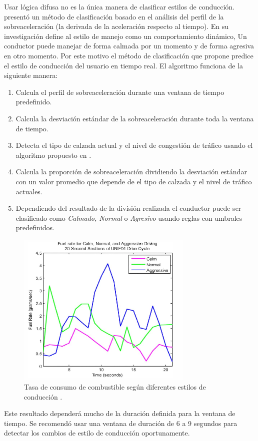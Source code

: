 Usar lógica difusa no es la única manera de clasificar estilos de conducción. \citeauthor{4938719} \cite{4938719} presentó un método de clasificación basado en el análisis del perfil de la sobreaceleración (la derivada de la aceleración respecto al tiempo). En su investigación define al estilo de manejo como un comportamiento dinámico, Un conductor puede manejar de forma calmada por un momento y de forma agresiva en otro momento. Por este motivo el método de clasificación que propone predice el estilo de conducción del usuario en tiempo real.
El algoritmo funciona de la siguiente manera:
\begin{enumerate}
    \itemsep0em
    \item Calcula el perfil de sobreaceleración durante una ventana de tiempo predefinido.
    \item Calcula la desviación estándar de la sobreaceleración durante toda la ventana de tiempo.
    \item Detecta el tipo de calzada actual y el nivel de congestión de tráfico usando el algoritmo propuesto en \cite{Highway_cap_manual}.
    \item Calcula la proporción de sobreaceleración dividiendo la desviación estándar con un valor promedio que depende de el tipo de calzada y el nivel de tráfico actuales.
    \item Dependiendo del resultado de la división realizada el conductor puede ser clasificado como {\it Calmado, Normal} o {\it Agresivo} usando reglas con umbrales predefinidos.
\end{enumerate}
\begin{figure}[htbp!]
\centering
\includegraphics[width=0.75\textwidth]{Fig3}
\caption[Tasa de consumo de combustible según diferentes estilos de conducción]{Tasa de consumo de combustible según diferentes estilos de conducción \cite{4938719}.}
\label{fig:2.3}
\end{figure}
Este resultado dependerá mucho de la duración definida para la ventana de tiempo. Se recomendó usar una ventana de duración de 6 a 9 segundos para detectar los cambios de estilo de conducción oportunamente.

